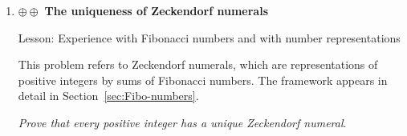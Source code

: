 \begin{enumerate}
{\sc Lesson:} Enhance understanding of the two main ways of representing rational numbers

\smallskip

It is well known that the decimal expansion of Euler's constant $e$ is infinite and non-periodic and that it begins
\[ e = 2.718281828 \cdots \]  
Therefore, Proposition~\ref{thm:rational-real} assures us that the infinite ultimately periodic decimal expansion (with added spaces to highlight the periodicity)
\[ 2.7 \ 1828 \ 1828 \ 1828 \ \cdots \ 1828 \ 1828 \ \cdots   \]
represents a rational number $r$ which agrees with $e$ for ten decimal places.

\smallskip

{\em Find a representation of $r$ as a fraction.  In more detail, find positive integers $p$ and $q$ such that}
\[ {p \over q} \ = \ r \ = \ 2.7 \ 1828 \ 1828 \ 1828 \ \cdots \ 1828 \ 1828 \ \cdots   \]


\medskip\item
$\oplus \oplus$ {\bf The uniqueness of Zeckendorf numerals}

{\sc Lesson:} Experience with Fibonacci numbers and with number representations

\smallskip

This problem refers to Zeckendorf numerals, which are representations of positive integers by sums of Fibonacci numbers.  The framework appears in detail in Section~\ref{sec:Fibo-numbers}.

\smallskip

{\em Prove that every positive integer has a unique Zeckendorf numeral}.

\end{enumerate}
